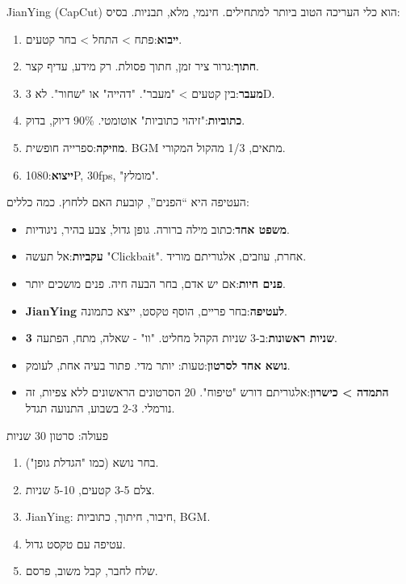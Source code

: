 
JianYing (CapCut) הוא כלי העריכה הטוב ביותר למתחילים. חינמי, מלא, תבניות. בסיס:

\begin{enumerate}
  \item \textbf{ייבוא}:פתח > התחל > בחר קטעים.
  \item \textbf{חתוך}:גרור ציר זמן, חתוך פסולת. רק מידע, עדיף קצר.
  \item \textbf{מעבר}:בין קטעים > "מעבר". "דהייה" או "שחור". לא 3D.
  \item \textbf{כתוביות}:"זיהוי כתוביות" אוטומטי. 90\% דיוק, בדוק.
  \item \textbf{מוזיקה}:ספרייה חופשית. BGM מתאים, 1/3 מהקול המקורי.
  \item \textbf{ייצוא}:1080P, 30fps, "מומלץ".
\end{enumerate}


העטיפה היא “הפנים”, קובעת האם ללחוץ. כמה כללים:

\begin{itemize}
  \item \textbf{משפט אחד}:כתוב מילה ברורה. גופן גדול, צבע בהיר, ניגודיות.
  \item \textbf{עקביות}:אל תעשה "Clickbait". אחרת, עוזבים, אלגוריתם מוריד.
  \item \textbf{פנים חיות}:אם יש אדם, בחר הבעה חיה. פנים מושכים יותר.
  \item \textbf{JianYing לעטיפה}:בחר פריים, הוסף טקסט, ייצא כתמונה.
\end{itemize}


\begin{itemize}
  \item \textbf{3 שניות ראשונות}:ב-3 שניות הקהל מחליט. "וו" - שאלה, מתח, הפתעה.
  \item \textbf{נושא אחד לסרטון}:טעות: יותר מדי. פתור בעיה אחת, לעומק.
  \item \textbf{התמדה > כישרון}:אלגוריתם דורש "טיפוח". 20 הסרטונים הראשונים ללא צפיות, זה נורמלי. 2-3 בשבוע, התנועה תגדל.
\end{itemize}

\begin{tcbpractice}{פעולה: סרטון 30 שניות}
\begin{enumerate}
  \item בחר נושא (כמו "הגדלת גופן").
  \item צלם 3-5 קטעים, 5-10 שניות.
  \item JianYing: חיבור, חיתוך, כתוביות, BGM.
  \item עטיפה עם טקסט גדול.
  \item שלח לחבר, קבל משוב, פרסם.
\end{enumerate}

\end{tcbpractice}


